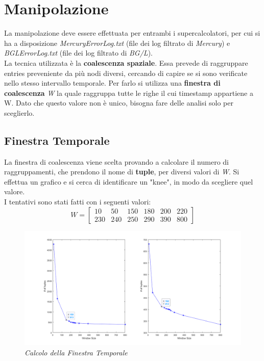 \section{Manipolazione}
La manipolazione deve essere effettuata per entrambi i supercalcolatori, per cui si ha a disposizione \textit{MercuryErrorLog.txt} (file dei log filtrato di \textit{Mercury}) e \textit{BGLErrorLog.txt} (file dei log filtrato di \textit{BG/L}).
\\La tecnica utilizzata è la \textbf{coalescenza spaziale}. Essa prevede di raggruppare entries preveniente da più nodi diversi, cercando di capire se si sono verificate nello stesso intervallo temporale. Per farlo si utilizza una \textbf{finestra di coalescenza} \textit{W} la quale raggruppa tutte le righe il cui timestamp appartiene a W. Dato che questo valore non è unico, bisogna fare delle analisi solo per sceglierlo.

\subsection{Finestra Temporale}
La finestra di coalescenza viene scelta provando a calcolare il numero di raggruppamenti, che prendono il nome di \textbf{tuple}, per diversi valori di \textit{W}. Si effettua un grafico e si cerca di identificare un "knee", in modo da scegliere quel valore.
\\I tentativi sono stati fatti con i seguenti valori:
\begin{equation*}
	W = \begin{bmatrix}
		10 & 50& 150& 180& 200& 220 \\ 230& 240& 250& 290& 390& 800
	\end{bmatrix}
\end{equation*}
\begin{figure}[H]
	\centering
	\includegraphics[width=\textwidth]{img/hw6/cwin.png}
	\caption{\textit{Calcolo della Finestra Temporale}}
\end{figure}

